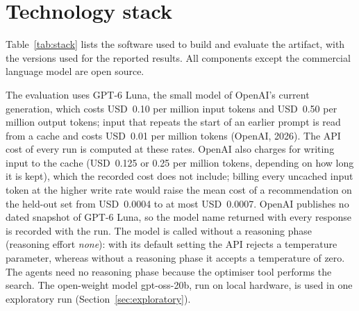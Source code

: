 \documentclass[12pt,a4paper]{report}
\begin{document}
\section{Technology stack}
\label{sec:stack}

Table~\ref{tab:stack} lists the software used to build and evaluate the
artifact, with the versions used for the reported results. All components
except the commercial language model are open source.

The evaluation uses GPT-6 Luna, the small model of OpenAI's current
generation, which costs USD~0.10 per million input tokens and USD~0.50
per million output tokens; input that repeats the start of an earlier
prompt is read from a cache and costs USD~0.01 per million tokens
(OpenAI, 2026). The API cost of every run is computed at these rates.
OpenAI also charges for writing input to the cache (USD~0.125 or 0.25
per million tokens, depending on how long it is kept), which the
recorded cost does not include; billing every uncached input token at
the higher write rate would raise the mean cost of a recommendation on
the held-out set from USD~0.0004 to at most USD~0.0007. OpenAI publishes
no dated snapshot of GPT-6 Luna, so the model name returned with every
response is recorded with the run. The model is called without a
reasoning phase (reasoning effort \emph{none}): with its default setting
the API rejects a temperature parameter, whereas without a reasoning
phase it accepts a temperature of zero. The agents need no reasoning
phase because the optimiser tool performs the search. The open-weight
model gpt-oss-20b, run on local hardware, is used in one exploratory
run (Section~\ref{sec:exploratory}).
\end{document}
